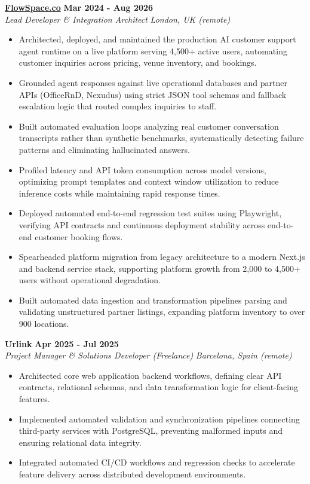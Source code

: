 \documentclass[10pt,a4paper]{article}
\newcommand{\role}[4]{%
  \textbf{#1} \hfill \textbf{#2}\\[1pt]%
  \textit{#3} \hfill \textit{#4}\\[2pt]%
}
\begin{document}
\role{\href{https://flowspace.co}{FlowSpace.co}}{Mar 2024 - Aug 2026}{Lead Developer \&  Integration Architect}{London, UK (remote)}
\begin{itemize}
  \item Architected, deployed, and maintained the production AI customer support agent runtime on a live platform serving 4,500+ active users, automating customer inquiries across pricing, venue inventory, and bookings.
  \item Grounded agent responses against live operational databases and partner APIs (OfficeRnD, Nexudus) using strict JSON tool schemas and fallback escalation logic that routed complex inquiries to staff.
  \item Built automated evaluation loops analyzing real customer conversation transcripts rather than synthetic benchmarks, systematically detecting failure patterns and eliminating hallucinated answers.
  \item Profiled latency and API token consumption across model versions, optimizing prompt templates and context window utilization to reduce inference costs while maintaining rapid response times.
  \item Deployed automated end-to-end regression test suites using Playwright, verifying API contracts and continuous deployment stability across end-to-end customer booking flows.
  \item Spearheaded platform migration from legacy architecture to a modern Next.js and backend service stack, supporting platform growth from 2,000 to 4,500+ users without operational degradation.
  \item Built automated data ingestion and transformation pipelines parsing and validating unstructured partner listings, expanding platform inventory to over 900 locations.
\end{itemize}

\role{Urlink}{Apr 2025 - Jul 2025}{Project Manager \&  Solutions Developer (Freelance)}{Barcelona, Spain (remote)}
\begin{itemize}
  \item Architected core web application backend workflows, defining clear API contracts, relational schemas, and data transformation logic for client-facing features.
  \item Implemented automated validation and synchronization pipelines connecting third-party services with PostgreSQL, preventing malformed inputs and ensuring relational data integrity.
  \item Integrated automated CI/CD workflows and regression checks to accelerate feature delivery across distributed development environments.
\end{itemize}
\end{document}
